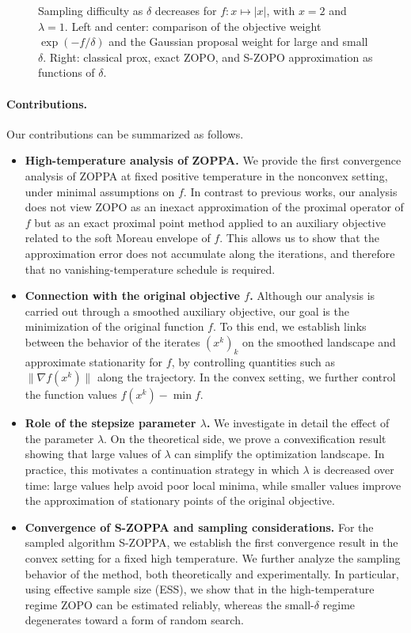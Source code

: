 \documentclass{article}
\begin{document}
\begin{figure}[htbp]
    \caption{Sampling difficulty as \(\delta\) decreases for \(f:x\mapsto |x|\), with \(x=2\) and \(\lambda=1\). Left and center: comparison of the objective weight \(\exp(-f/\delta)\) and the Gaussian proposal weight for large and small \(\delta\). Right: classical prox, exact ZOPO, and S-ZOPO approximation as functions of \(\delta\).}
    \label{fig:intro_sampling}
\end{figure}

\paragraph{Contributions.}
Our contributions can be summarized as follows.

\begin{itemize}
    \item \textbf{High-temperature analysis of ZOPPA.}
    We provide the first convergence analysis of ZOPPA at fixed positive temperature in the nonconvex setting, under minimal assumptions on \(f\). In contrast to previous works, our analysis does not view ZOPO as an inexact approximation of the proximal operator of \(f\) but as an exact proximal point method applied to an auxiliary objective related to the soft Moreau envelope of \(f\). This allows us to show that the approximation error does not accumulate along the iterations, and therefore that no vanishing-temperature schedule is required. 
    \item \textbf{Connection with the original objective \(f\).}
    Although our analysis is carried out through a smoothed auxiliary objective, our goal is the minimization of the original function \(f\). To this end, we establish links between the behavior of the iterates \((x^k)_k\) on the smoothed landscape and approximate stationarity for \(f\), by controlling quantities such as \(\|\nabla f(x^k)\|\) along the trajectory. In the convex setting, we further control the function values \(f(x^k)-\min f\).
    \item \textbf{Role of the stepsize parameter \(\lambda\).} We investigate in detail the effect of the parameter \(\lambda\). On the theoretical side, we prove a convexification result showing that large values of \(\lambda\) can simplify the optimization landscape. In practice, this motivates a continuation strategy in which \(\lambda\)
    is decreased over time: large values help avoid poor local minima, while smaller values improve the approximation of stationary points of the original objective.
    \item \textbf{Convergence of S-ZOPPA and sampling considerations.}
    For the sampled algorithm S-ZOPPA, we establish the first convergence result in the convex setting for a fixed high temperature. We further analyze the sampling behavior of the method, both theoretically and experimentally. In particular, using effective sample size (ESS), we show that in the high-temperature regime  ZOPO can be estimated reliably, whereas the small-\(\delta\) regime degenerates toward a form of random search.
\end{itemize}
\end{document}
